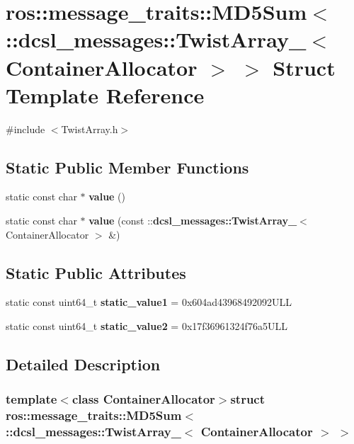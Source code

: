 \section{ros\-:\-:message\-\_\-traits\-:\-:\-M\-D5\-Sum$<$ \-:\-:dcsl\-\_\-messages\-:\-:\-Twist\-Array\-\_\-$<$ \-Container\-Allocator $>$ $>$ \-Struct \-Template \-Reference}
\label{structros_1_1message__traits_1_1MD5Sum_3_01_1_1dcsl__messages_1_1TwistArray___3_01ContainerAllocator_01_4_01_4}


{\ttfamily \#include $<$\-Twist\-Array.\-h$>$}

\subsection*{\-Static \-Public \-Member \-Functions}
\begin{DoxyCompactItemize}
\item 
static const char $\ast$ {\bf value} ()
\item 
static const char $\ast$ {\bf value} (const \-::{\bf dcsl\-\_\-messages\-::\-Twist\-Array\-\_\-}$<$ \-Container\-Allocator $>$ \&)
\end{DoxyCompactItemize}
\subsection*{\-Static \-Public \-Attributes}
\begin{DoxyCompactItemize}
\item 
static const uint64\-\_\-t {\bf static\-\_\-value1} = 0x604ad43968492092\-U\-L\-L
\item 
static const uint64\-\_\-t {\bf static\-\_\-value2} = 0x17f36961324f76a5\-U\-L\-L
\end{DoxyCompactItemize}


\subsection{\-Detailed \-Description}
\subsubsection*{template$<$class Container\-Allocator$>$struct ros\-::message\-\_\-traits\-::\-M\-D5\-Sum$<$ \-::dcsl\-\_\-messages\-::\-Twist\-Array\-\_\-$<$ Container\-Allocator $>$ $>$}



